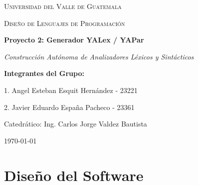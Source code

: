 \documentclass[12pt,letterpaper]{article}
\begin{document}
\begin{titlepage}
    \centering
    \vspace*{1cm}
    
    {\scshape\LARGE Universidad del Valle de Guatemala \par}
    \vspace{1cm}
    {\scshape\Large Diseño de Lenguajes de Programación \par}
    \vspace{1.5cm}
    {\huge\bfseries Proyecto 2: Generador YALex / YAPar \par}
    \vspace{0.5cm}
    {\large\itshape Construcción Autónoma de Analizadores Léxicos y Sintácticos \par}
    \vspace{2cm}
    
    {\Large\bfseries Integrantes del Grupo: \par}
    \vspace{0.5cm}
    {\large 1. Angel Esteban Esquit Hernández - 23221 \par}
    {\large 2. Javier Eduardo España Pacheco - 23361 \par}
    
    \vfill
    {\large Catedrático: Ing. Carlos Jorge Valdez Bautista \par}
    \vspace{0.8cm}
    {\large \today \par}
\end{titlepage}

\newpage
\tableofcontents
\newpage

\section{Diseño del Software}
\end{document}
